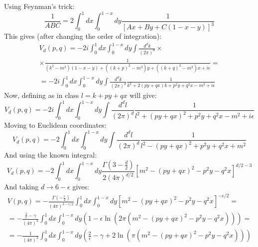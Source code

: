 \documentclass{article}
\begin{document}
Using Feynman's trick:
\begin{equation}
    \frac{1}{ABC} = 2\int_0^1 dx \int_0^{1-x} dy \frac{1}{\left[Ax + By + C(1 - x - y)\right]^3}
\end{equation}
This gives (after changing the order of integration):
\begin{equation}
\begin{gathered}
    V_d(p, q) = -2i \int_0^1 dx \int_0^{1-x} dy\int \frac{d^dk}{(2\pi)^d} \times \\ \times
    \frac{1}{\left(k^2 - m^2\right)(1 - x - y) + \left((k + p)^2 - m^2\right)y + \left((k + q)^2 - m^2\right)x + i\epsilon} = \\ =
    -2i \int_0^1 dx \int_0^{1-x} dy\int \frac{d^dk}{(2\pi)^d}
    \frac{1}{k^2 + 2(py + qx)k + p^2y + q^2x - m^2 + i\epsilon}
\end{gathered}
\end{equation}
Now, defining as in class $l = k + py + qx$ will give:
\begin{equation}
    V_d(p, q) =
    -2i \int_0^1 dx \int_0^{1-x} dy\int \frac{d^dl}{(2\pi)^d}
    \frac{1}{l^2 + (py + qx)^2 + p^2y + q^2x - m^2 + i\epsilon}
\end{equation}
Moving to Euclidean coordinates:
\begin{equation}
    V_d(p, q) =
    -2 \int_0^1 dx \int_0^{1-x} dy\int \frac{d^dl}{(2\pi)^d}
    \frac{1}{l^2 - (py + qx)^2 + p^2y + q^2x + m^2}
\end{equation}
And using the known integral:
\begin{equation}
    V_d(p, q) =
    -2 \int_0^1 dx \int_0^{1-x} dy
    \frac{\Gamma\left(3 - \frac{d}{2}\right)}{2\left(4\pi\right)^{d/2}}
    \left[m^2 - (py + qx)^2 - p^2y - q^2x\right]^{d/2 - 3}
\end{equation}
And taking $d \rightarrow 6 - \epsilon$ gives:
\begin{equation}
\begin{gathered}
    V(p, q) =
    -\frac{\Gamma\left(-\frac{\epsilon}{2}\right)}{\left(4\pi\right)^{3 - \epsilon/2}}
     \int_0^1 dx \int_0^{1-x} dy
    \left[m^2 - (py + qx)^2 - p^2y - q^2x\right]^{-\epsilon/2} = \\ =
    -\frac{\frac{2}{\epsilon} - \gamma}{\left(4\pi\right)^{3}}
     \int_0^1 dx \int_0^{1-x} dy
    \left(1 - \epsilon\ln(2\pi \left(m^2 - (py + qx)^2 - p^2y - q^2x\right))\right) = \\ =
    -\frac{1}{\left(4\pi\right)^{3}}
     \int_0^1 dx \int_0^{1-x} dy
    \left(\frac{2}{\epsilon} - \gamma + 2\ln(\pi \left(m^2 - (py + qx)^2 - p^2y - q^2x\right))\right)
\end{gathered}
\end{equation}
\end{document}
